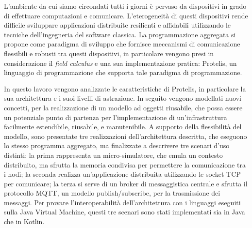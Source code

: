 L'ambiente da cui siamo circondati tutti i giorni è pervaso da dispositivi in
grado di effettuare computazioni e comunicare. L'eterogeneità di questi
dispositivi rende difficile sviluppare applicazioni distribuite resilienti e
affidabili utilizzando le tecniche dell'ingegneria del software classica. La
programmazione aggregata si propone come paradigma di sviluppo che fornisce
meccanismi di comunicazione flessibili e robusti tra questi dispositivi, in
particolare vengono presi in considerazione il \textit{field calculus} e una sua
implementazione pratica: Protelis, un linguaggio di programmazione che supporta
tale paradigma di programmazione.

In questo lavoro vengono analizzate le caratteristiche di Protelis, in
particolare la sua architettura e i suoi livelli di astrazione. In seguito
vengono modellati nuovi concetti, per la realizzazione di un modello ad oggetti
riusabile, che possa essere un potenziale punto di partenza per
l'implementazione di un'infrastruttura facilmente estendibile, riusabile, e
manutenibile. A supporto della flessibilità del modello, sono presentate tre
realizzazioni dell'architettura descritta, che eseguono lo stesso programma
aggregato, ma finalizzate a descrivere tre scenari d'uso distinti: la prima
rappresenta un micro-simulatore, che emula un contesto distribuito, ma sfrutta
la memoria condivisa per permettere la comunicazione tra i nodi; la seconda
realizza un'applicazione distribuita utilizzando le socket TCP per comunicare;
la terza si serve di un broker di messaggistica centrale e sfrutta il protocollo
MQTT, un modello publish/subscribe, per la trasmissione dei messaggi. Per
provare l'interoperabilità dell'architettura con i linguaggi eseguiti sulla Java
Virtual Machine, questi tre scenari sono stati implementati sia in Java che in
Kotlin.




